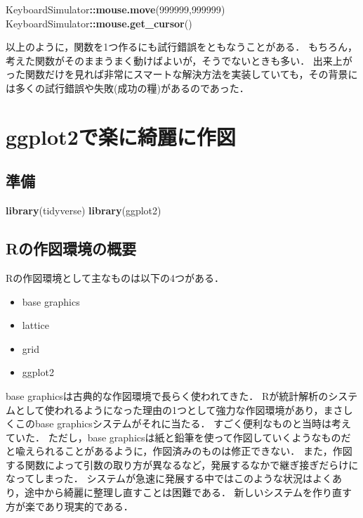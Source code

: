 \documentclass[
]{article}
\newenvironment{Shaded}{\begin{snugshade}}{\end{snugshade}}
\newcommand{\DecValTok}[1]{\textcolor[rgb]{0.00,0.00,0.81}{#1}}
\newcommand{\FunctionTok}[1]{\textcolor[rgb]{0.13,0.29,0.53}{\textbf{#1}}}
\newcommand{\NormalTok}[1]{#1}
\newcommand{\SpecialCharTok}[1]{\textcolor[rgb]{0.81,0.36,0.00}{\textbf{#1}}}
\providecommand{\tightlist}{%
  \setlength{\itemsep}{0pt}\setlength{\parskip}{0pt}}
\begin{document}
\begin{Shaded}
\begin{Highlighting}[]
\NormalTok{KeyboardSimulator}\SpecialCharTok{::}\FunctionTok{mouse.move}\NormalTok{(}\DecValTok{999999}\NormalTok{,}\DecValTok{999999}\NormalTok{)}
\NormalTok{KeyboardSimulator}\SpecialCharTok{::}\FunctionTok{mouse.get\_cursor}\NormalTok{()}
\end{Highlighting}
\end{Shaded}

以上のように，関数を1つ作るにも試行錯誤をともなうことがある．
もちろん，考えた関数がそのままうまく動けばよいが，そうでないときも多い．
出来上がった関数だけを見れば非常にスマートな解決方法を実装していても，その背景には多くの試行錯誤や失敗(成功の糧)があるのであった．

\hypertarget{ggplot2}{%
\section{ggplot2で楽に綺麗に作図}\label{ggplot2}}

\hypertarget{ux6e96ux5099-9}{%
\subsection{準備}\label{ux6e96ux5099-9}}

\begin{Shaded}
\begin{Highlighting}[]
\FunctionTok{library}\NormalTok{(tidyverse)}
\FunctionTok{library}\NormalTok{(ggplot2)}
\end{Highlighting}
\end{Shaded}

\hypertarget{rux306eux4f5cux56f3ux74b0ux5883ux306eux6982ux8981}{%
\subsection{Rの作図環境の概要}\label{rux306eux4f5cux56f3ux74b0ux5883ux306eux6982ux8981}}

Rの作図環境として主なものは以下の4つがある．

\begin{itemize}
\tightlist
\item
  base graphics
\item
  lattice
\item
  grid
\item
  ggplot2
\end{itemize}

base graphicsは古典的な作図環境で長らく使われてきた．
Rが統計解析のシステムとして使われるようになった理由の1つとして強力な作図環境があり，まさしくこのbase graphicsシステムがそれに当たる．
すごく便利なものと当時は考えていた．
ただし，base graphicsは紙と鉛筆を使って作図していくようなものだと喩えられることがあるように，作図済みのものは修正できない．
また，作図する関数によって引数の取り方が異なるなど，発展するなかで継ぎ接ぎだらけになってしまった．
システムが急速に発展する中ではこのような状況はよくあり，途中から綺麗に整理し直すことは困難である．
新しいシステムを作り直す方が楽であり現実的である．
\end{document}

